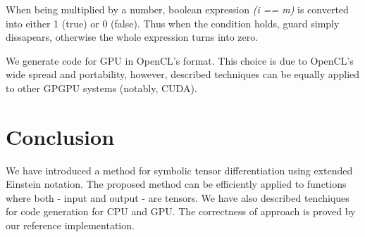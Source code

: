 \documentclass[conference]{IEEEtran}
\begin{document}
When being multiplied by a number, boolean expression \textit{(i ==
  m)} is converted into either 1 (true) or 0 (false). Thus when the
condition holds, guard simply dissapears, otherwise the whole
expression turns into zero.

We generate code for GPU in OpenCL's format. This choice is due to
OpenCL's wide spread and portability, however, described techniques
can be equally applied to other GPGPU systems (notably, CUDA).

\section{Conclusion}

We have introduced a method for symbolic tensor differentiation using
extended Einstein notation. The proposed method can be efficiently
applied to functions where both - input and output - are tensors. We
have also described tenchiques for code generation for CPU and
GPU. The correctness of approach is proved by our reference
implementation.



 



\end{document}
